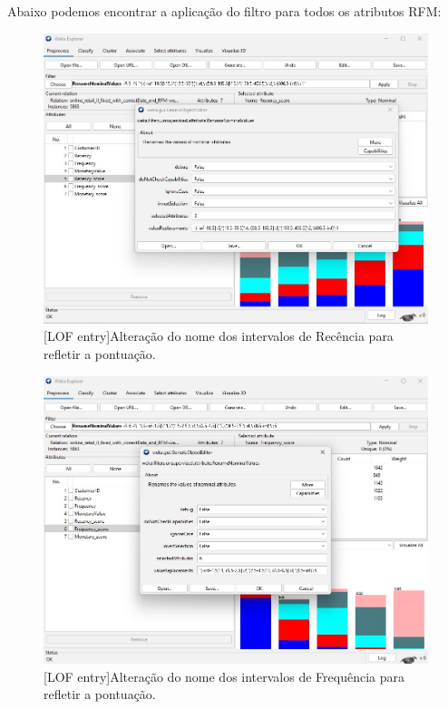 \documentclass{easychair}
\begin{document}
Abaixo podemos encontrar a aplicação do filtro para todos os atributos RFM:

\begin{figure}[H]
    \begin{centering}
    \includegraphics[width=0.85\linewidth]{imagens/figure9.jpg}\label{cap-4-fig9}
    [LOF entry]{Alteração do nome dos intervalos de Recência para refletir a pontuação.}
    \label{fig9}
    \end{centering}
\end{figure}

\begin{figure}[H]
    \begin{centering}
    \includegraphics[width=0.85\linewidth]{imagens/figure10.jpg}\label{cap-4-fig10}
    [LOF entry]{Alteração do nome dos intervalos de Frequência para refletir a pontuação.}
    \label{fig10}
    \end{centering}
\end{figure}
\end{document}
